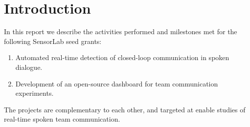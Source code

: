 \chapter{Introduction}

In this report we describe the activities performed and milestones met for the
following SensorLab seed grants:

\begin{enumerate}
    \item Automated real-time detection of closed-loop communication in spoken
        dialogue.
    \item Development of an open-source dashboard for team communication
        experiments.
\end{enumerate}

The projects are complementary to each other, and targeted at enable studies of
real-time spoken team communication.

